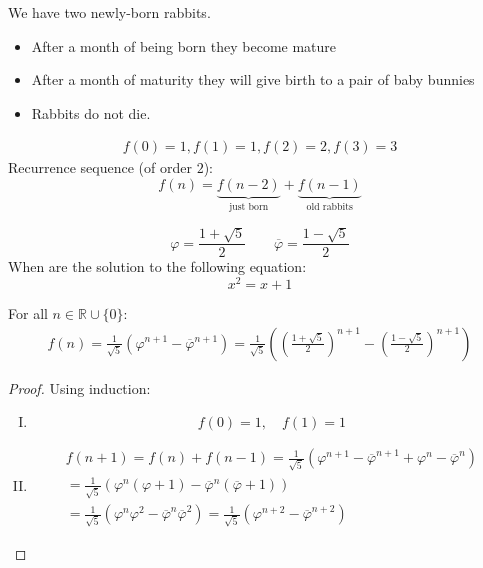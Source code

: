 \documentclass[00_complete]{subfiles}
\begin{document}
\begin{example}
    We have two newly-born rabbits.
\begin{itemize}
    \item After a month of being born they become mature
        \item After a month of maturity they will give birth to a pair of baby
            bunnies
        \item Rabbits do not die.
\end{itemize}
\begin{gather*}
    f(0)=1, f(1)=1, f(2)=2, f(3)=3
\end{gather*}
Recurrence sequence (of order $2$):
$$f(n)=\underbrace{f(n-2)}_{\text{just born}}+\underbrace{f(n-1)}_{\text{old
rabbits}}$$
\begin{symbols}
    $$\varphi = \frac{1+\sqrt 5}{2} \qquad \overline \varphi = \frac{ 1- \sqrt 5}{2}$$
    When are the solution to the following equation:
    $$x^2=x+1$$
\end{symbols}
\begin{claim}
    For all $n \in \mathbb{R}\cup\{0\}$:
    \begin{gather*}
        f(n)=\frac{1}{\sqrt 5}\left(\varphi^{n+1}-\overline \varphi^{n+1}\right)
        =\frac{1}{\sqrt 5}\left(\left(\frac{1+\sqrt 5}{2}\right)^{n+1}-\left(\frac{1-\sqrt 5}{2}\right)^{n+1}\right)
    \end{gather*}
\end{claim}
\begin{proof}
    Using induction:
    \begin{enumerate}[I.]
        \item \begin{equation}
            f(0)=1, \quad f(1)=1
            \tag{\checkmark}
        \end{equation}
        \item
        \begin{gather*}
            f(n+1)=f(n)+f(n-1)=\frac{1}{\sqrt 5}(\varphi^{n+1}-\overline
            \varphi^{n+1}+\varphi^n-\overline \varphi^n) \\
            = \frac{1}{\sqrt 5} (\varphi^n(\varphi+1)-\overline
            \varphi^n(\overline \varphi +1)) \\
            =\frac{1}{\sqrt 5}(\varphi^n\varphi^2-\overline \varphi^n \overline
            \varphi^2) = \frac{1}{\sqrt 5}(\varphi^{n+2}-\overline \varphi^{n+2})
            \tag{\checkmark}
        \end{gather*}
    \end{enumerate}
\end{proof}
\end{example}
\end{document}
